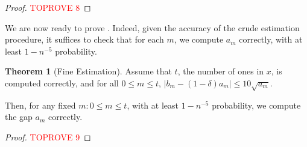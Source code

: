 \documentclass[12pt]{article}
\theoremstyle{definition}
\newtheorem{theorem}{Theorem}[section]
\theoremstyle{remark}
\begin{document}
\begin{proof}\textcolor{red}{TOPROVE 8}\end{proof}

We are now ready to prove . Indeed, given the accuracy of the crude estimation procedure, it suffices to check that for each $m$, we compute $a_m$ correctly, with at least $1 - n^{-5}$ probability.

\begin{theorem}[Fine Estimation] \label{thm:fine}
    Assume that $t$, the number of ones in $x$, is computed correctly, and for all $0 \le m \le t$, $|b_m-(1-\delta) a_m| \le 10 \sqrt{a_m}$.

    Then, for any fixed $m: 0 \le m \le t$, with at least $1 - n^{-5}$ probability, we compute the gap $a_m$ correctly.
\end{theorem}

\begin{proof}\textcolor{red}{TOPROVE 9}\end{proof}





\end{document}
